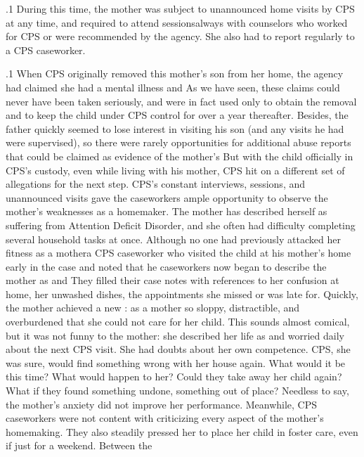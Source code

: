 \documentclass[11pt, twoside]{article}
\begin{document}
{\p.1{%
During this time, the mother was subject to unannounced home visits by CPS at any time, and required to attend 
sessions\mdash{}always with counselors who worked for CPS or were recommended by the agency. She also had to report regularly to a CPS
caseworker.
}%

\p.1{%
When CPS originally removed this mother's son from her home, the
agency had claimed she had a mental illness and 
As we have seen, these claims could never have been taken seriously, and
were in fact used only to obtain the removal and to keep the child under CPS control for over a year thereafter. Besides, the father quickly
seemed to lose interest in visiting his son (and any visits he had were
supervised), so there were rarely opportunities for additional abuse reports that could be claimed as evidence of the mother's  But with
the child officially in CPS's custody, even while living with his mother,
CPS hit on a different set of allegations for the next step.
CPS's constant interviews,  sessions, and unannounced visits gave the caseworkers ample opportunity to observe the mother's
weaknesses as a homemaker. The mother has described herself as suffering from Attention Deficit Disorder, and she often had difficulty
completing several household tasks at once. Although no one had previously attacked her fitness as a mother\mdash{}a CPS caseworker who visited
the child at his mother's home early in the case  and noted that he  \mdash{}caseworkers now
began to describe the mother as  and  They filled
their case notes with references to her confusion at home, her unwashed
dishes, the appointments she missed or was late for. Quickly, the mother
achieved a new : as a mother so sloppy, distractible, and
overburdened that she could not care for her child.
This sounds almost comical, but it was not funny to the mother: she
described her life as  and worried daily about the
next CPS visit. She had doubts about her own competence. CPS, she was
sure, would find something wrong with her house again. What would it
be this time? What would happen to her? Could they take away her child
again? What if they found something undone, something out of place?
Needless to say, the mother's anxiety did not improve her performance.
Meanwhile, CPS caseworkers were not content with criticizing every
aspect of the mother's homemaking. They also steadily pressed her to
place her child in foster care, even if just for a weekend. Between the
}}
\end{document}
